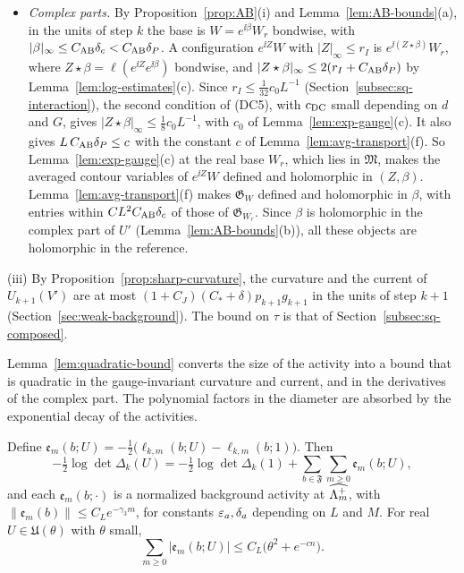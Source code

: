 \begin{remark}
\begin{itemize}
\item \emph{Complex parts.} By Proposition~\ref{prop:AB}(i) and Lemma~\ref{lem:AB-bounds}(a), in the units of step $k$ the base is $W=e^{\ii\beta}W_r$ bondwise, with $|\beta|_\infty\le C_{\rm AB}\delta_c<C_{\rm AB}\delta_P$. A configuration $e^{\ii Z}W$ with $|Z|_\infty\le r_I$ is $e^{\ii(Z\star\beta)}W_r$, where $Z\star\beta=\ell(e^{\ii Z}e^{\ii\beta})$ bondwise, and $|Z\star\beta|_\infty\le2(r_I+C_{\rm AB}\delta_P)$ by Lemma~\ref{lem:log-estimates}(c). Since $r_I\le\frac1{32}c_0L^{-1}$ (Section~\ref{subsec:sq-interaction}), the second condition of (DC5), with $c_{\rm DC}$ small depending on $d$ and $G$, gives $|Z\star\beta|_\infty\le\frac18c_0L^{-1}$, with $c_0$ of Lemma~\ref{lem:exp-gauge}(c). It also gives $L\,C_{\rm AB}\delta_P\le c$ with the constant $c$ of Lemma~\ref{lem:avg-transport}(f). So Lemma~\ref{lem:exp-gauge}(c) at the real base $W_r$, which lies in $\mathfrak M$, makes the averaged contour variables of $e^{\ii Z}W$ defined and holomorphic in $(Z,\beta)$. Lemma~\ref{lem:avg-transport}(f) makes $\mathfrak G_W$ defined and holomorphic in $\beta$, with entries within $CL^2C_{\rm AB}\delta_c$ of those of $\mathfrak G_{W_r}$. Since $\beta$ is holomorphic in the complex part of $U'$ (Lemma~\ref{lem:AB-bounds}(b)), all these objects are holomorphic in the reference.
\end{itemize}

(iii) By Proposition~\ref{prop:sharp-curvature}, the curvature and the current of $U_{k+1}(V')$ are at most $(1+C_J)(C_*+\delta)p_{k+1}g_{k+1}$ in the units of step $k+1$ (Section~\ref{sec:weak-background}). The bound on $\tau$ is that of Section~\ref{subsec:sq-composed}.
\end{remark}

Lemma~\ref{lem:quadratic-bound} converts the size of the activity into a bound that is quadratic in the gauge-invariant curvature and current, and in the derivatives of the complex part. The polynomial factors in the diameter are absorbed by the exponential decay of the activities.

\begin{corollary}\label{cor:one-loop}
Define $\mathfrak e_m(b;U)=-\frac12\big(\ell_{k,m}(b;U)-\ell_{k,m}(b;1)\big)$. Then
\[
-\tfrac12\log\det\Delta_k(U)=-\tfrac12\log\det\Delta_k(1)+\sum_{b\in\mathfrak F}\sum_{m\ge0}\mathfrak e_m(b;U),
\]
and each $\mathfrak e_m(b;\cdot)$ is a normalized background activity at $\widehat{\Lambda_m^+}$, with $\|\mathfrak e_m(b)\|\le C_Le^{-\gamma_3m}$, for constants $\varepsilon_a,\delta_a$ depending on $L$ and $M$. For real $U\in\mathfrak U(\theta)$ with $\theta$ small,
\[
\sum_{m\ge0}|\mathfrak e_m(b;U)|\le C_L\big(\theta^2+e^{-cn}\big) .
\]
\end{corollary}

